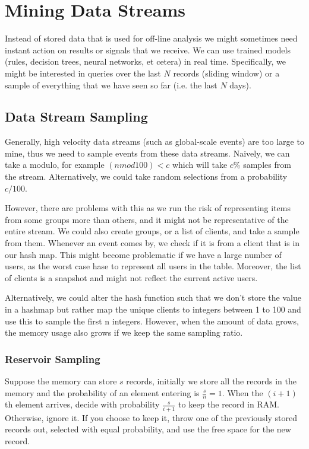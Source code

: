 \section{Mining Data Streams}

Instead of stored data that is used for off-line analysis
we might sometimes need instant action on results or signals
that we receive. We can use trained models (rules, decision trees,
neural networks, et cetera) in real time. Specifically, we might
be interested in queries over the last $N$ records (sliding window)
or a sample of everything that we have seen so far (i.e. the last $N$ days).

\subsection{Data Stream Sampling}

Generally, high velocity data streams (such as global-scale events) are
too large to mine, thus we need to sample events from these data streams.
Naively, we can take a modulo, for example $(n mod 100) < c$ which will take
$c\%$ samples from the stream. Alternatively, we could take random selections
from a probability $c / 100$.

However, there are problems with this as we run the risk of representing items
from some groups more than others, and it might not be representative
of the entire
stream.
We could also create groups, or a list of clients, and take a sample from them.
Whenever an event comes by, we check if it is from a client that is in our hash
map. This might become problematic if we have a large number of
users, as the worst
case hase to represent all users in the table. Moreover, the list of
clients is a snapshot
and might not reflect the current active users.

Alternatively, we could alter the hash function such that we don't store
the value in a hashmap but rather map the unique clients to integers between
1 to 100 and use this to sample the first n integers. However, when the amount
of data grows, the memory usage also grows if we keep the same sampling ratio.

\subsubsection{Reservoir Sampling}

Suppose the memory can store $s$ records, initially we store all the records
in the memory and the probability of an element entering is
$\frac{s}{n} = 1$. When
the $(i + 1)$th element arrives, decide with probability $\frac{s}{i
+ 1}$ to keep
the record in RAM. Otherwise, ignore it. If you choose to keep it, throw one of
the previously stored records out, selected with equal probability, and use the
free space for the new record.

